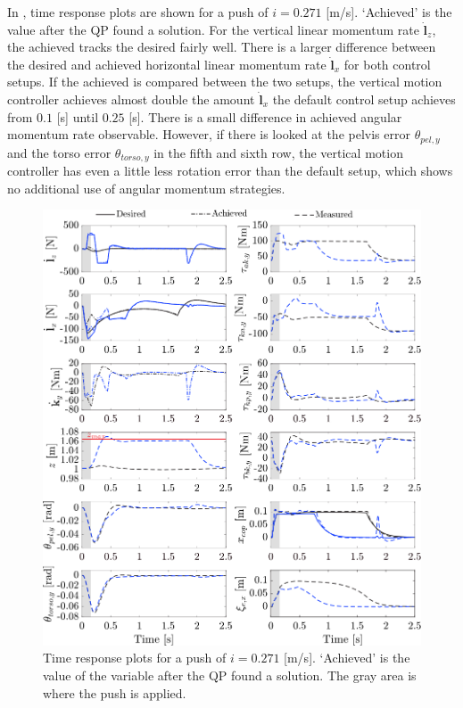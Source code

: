 In , time response plots are shown for a push of $i=0.271$ [m/s]. `Achieved' is the value after the \ac{QP} found a solution. For the vertical linear momentum rate $\dot{\mathbf{l}}_z$, the achieved tracks the desired fairly well. There is a larger difference between the desired and achieved horizontal linear momentum rate $\dot{\mathbf{l}}_x$ for both control setups. If the achieved is compared between the two setups, the vertical motion controller achieves almost double the amount $\dot{\mathbf{l}}_x$ the default control setup achieves from $0.1$ [s] until $0.25$ [s]. There is a small difference in achieved angular momentum rate observable. However, if there is looked at the pelvis error $\theta_{pel,y}$ and the torso error $\theta_{torso,y}$ in the fifth and sixth row, the vertical motion controller has even a little less rotation error than the default setup, which shows no additional use of angular momentum strategies.
\begin{figure}
\centering
\includegraphics[width=1.0\textwidth]{STYLESTUFF/valcomparetime.png}
\caption{Time response plots for a push of $i=0.271$ [m/s]. `Achieved' is the value of the variable after the \ac{QP} found a solution. The gray area is where the push is applied.}
\label{fig:valcomparetime}
\end{figure}

